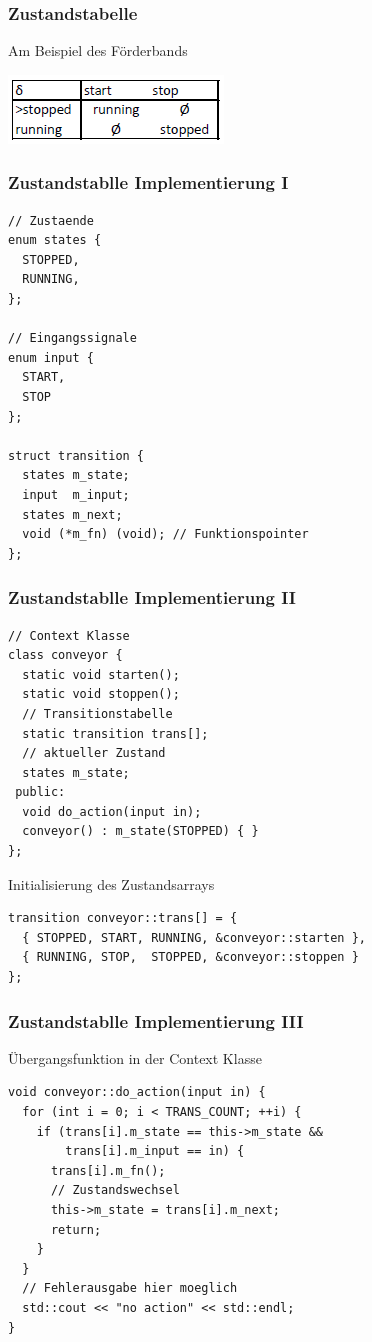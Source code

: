 \documentclass{beamer}
\begin{document}
\begin{frame}
 \frametitle{Zustandstabelle}
 Am Beispiel des F\"orderbands
 \newline
 \begin{center}
 \includegraphics{img/zustandstabelle.PNG}
 \end{center}
\end{frame}

\begin{frame}[fragile]
 \frametitle{Zustandstablle Implementierung I}
 \begin{lstlisting}
// Zustaende
enum states {
  STOPPED,
  RUNNING,
};

// Eingangssignale
enum input {
  START,
  STOP
};

struct transition {
  states m_state;
  input  m_input;
  states m_next;
  void (*m_fn) (void); // Funktionspointer
};
 \end{lstlisting}
\end{frame}

\begin{frame}[fragile]
 \frametitle{Zustandstablle Implementierung II}
 \begin{lstlisting}
// Context Klasse
class conveyor {
  static void starten();
  static void stoppen();
  // Transitionstabelle
  static transition trans[];
  // aktueller Zustand
  states m_state;
 public:
  void do_action(input in);
  conveyor() : m_state(STOPPED) { }
};
 \end{lstlisting}
 Initialisierung des Zustandsarrays
 \begin{lstlisting}
transition conveyor::trans[] = {
  { STOPPED, START, RUNNING, &conveyor::starten },
  { RUNNING, STOP,  STOPPED, &conveyor::stoppen }
};
 \end{lstlisting}
\end{frame}

\begin{frame}[fragile]
 \frametitle{Zustandstablle Implementierung III}
 \"Ubergangsfunktion in der Context Klasse
 \begin{lstlisting}
void conveyor::do_action(input in) {
  for (int i = 0; i < TRANS_COUNT; ++i) {
    if (trans[i].m_state == this->m_state &&
        trans[i].m_input == in) {
      trans[i].m_fn();
      // Zustandswechsel
      this->m_state = trans[i].m_next;
      return;
    }
  }
  // Fehlerausgabe hier moeglich
  std::cout << "no action" << std::endl;
}
 \end{lstlisting}
\end{frame}
\end{document}
